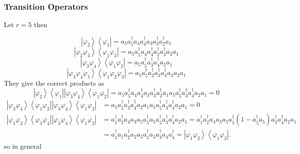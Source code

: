 \documentclass[aps,preprint]{revtex4}%
\begin{document}
\subsubsection{Transition Operators}

Let $r=5$ then%

\begin{equation}
\left\vert \varphi_{2}\right\rangle \left\langle \varphi_{1}\right\vert
=a_{5}a_{5}^{\dagger}a_{4}a_{4}^{\dagger}a_{3}a_{3}^{\dagger}a_{2}^{\dagger
}a_{1}%
\end{equation}%
\begin{equation}
\left\vert \varphi_{2}\varphi_{3}\right\rangle \left\langle \varphi_{1}%
\varphi_{2}\right\vert =a_{5}a_{5}^{\dagger}a_{4}a_{4}^{\dagger}a_{2}%
^{\dagger}a_{3}^{\dagger}a_{2}a_{1}%
\end{equation}%
\begin{equation}
\left\vert \varphi_{3}\varphi_{4}\right\rangle \left\langle \varphi_{1}%
\varphi_{2}\right\vert =a_{5}a_{5}^{\dagger}a_{3}^{\dagger}a_{4}^{\dagger
}a_{2}a_{1}%
\end{equation}%
\begin{equation}
\left\vert \varphi_{3}\varphi_{4}\varphi_{5}\right\rangle \left\langle
\varphi_{1}\varphi_{2}\varphi_{3}\right\vert =a_{5}a_{5}^{\dagger}%
a_{2}^{\dagger}a_{3}^{\dagger}a_{4}^{\dagger}a_{3}a_{2}a_{1}%
\end{equation}
They give the correct products as
\begin{equation}
\left\vert \varphi_{2}\right\rangle \left\langle \varphi_{1}\right\vert
\left\vert \varphi_{3}\varphi_{4}\right\rangle \left\langle \varphi_{1}%
\varphi_{2}\right\vert =a_{5}a_{5}^{\dagger}a_{4}a_{4}^{\dagger}a_{3}%
a_{3}^{\dagger}a_{2}^{\dagger}a_{1}a_{5}a_{5}^{\dagger}a_{3}^{\dagger}%
a_{4}^{\dagger}a_{2}a_{1}=0
\end{equation}%
\begin{align}
\left\vert \varphi_{3}\varphi_{4}\right\rangle \left\langle \varphi_{1}%
\varphi_{2}\right\vert \left\vert \varphi_{3}\varphi_{4}\right\rangle
\left\langle \varphi_{1}\varphi_{2}\right\vert  &  =a_{5}a_{5}^{\dagger}%
a_{3}^{\dagger}a_{4}^{\dagger}a_{2}a_{1}a_{5}a_{5}^{\dagger}a_{3}^{\dagger
}a_{4}^{\dagger}a_{2}a_{1}=0\\
\left\vert \varphi_{1}\varphi_{2}\right\rangle \left\langle \varphi_{3}%
\varphi_{4}\right\vert \left\vert \varphi_{3}\varphi_{4}\right\rangle
\left\langle \varphi_{1}\varphi_{2}\right\vert  &  =a_{1}^{\dagger}%
a_{2}^{\dagger}a_{4}a_{3}a_{5}a_{5}^{\dagger}a_{5}a_{5}^{\dagger}%
a_{3}^{\dagger}a_{4}^{\dagger}a_{2}a_{1}=a_{1}^{\dagger}a_{2}^{\dagger}%
a_{4}a_{3}a_{5}a_{5}^{\dagger}\left(  1-a_{5}^{\dagger}a_{5}\right)
a_{3}^{\dagger}a_{4}^{\dagger}a_{2}a_{1}\\
&  =a_{1}^{\dagger}a_{1}a_{2}^{\dagger}a_{2}a_{5}a_{5}^{\dagger}a_{3}%
a_{3}^{\dagger}a_{4}a_{4}^{\dagger}=\left\vert \varphi_{1}\varphi
_{2}\right\rangle \left\langle \varphi_{1}\varphi_{2}\right\vert .
\end{align}
so in general%
\end{document}
